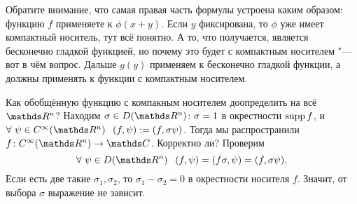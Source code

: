 Обратите внимание, что самая правая часть формулы устроена каким образом: функцию $f$ применяете к $\phi(x+y)$. Если $y$ фиксирована, то $\phi$ уже имеет компактный носитель, тут всё понятно. А то, что получается, является бесконечно гладкой функцией, но почему это будет с компактным носителем "--- вот в чём вопрос. Дальше $g(y)$ применяем к бесконечно гладкой функции, а должны применять к функции с компактным носителем.

Как обобщённую функцию с компакным носителем доопределить на всё $\R^n$? Находим $\sigma\in D(\R^n)\colon \sigma=1$ в окрестности $\operatorname{supp} f$, и $\forall\ \psi\in C^{\infty}(\R^n)\pau (f,\psi):=(f,\sigma \psi)$. Тогда мы распространили $f\colon C^{\infty}(\R^n)\to \C$. Корректно ли? Проверим
\[\forall\ \psi\in D(\R^n)\pau (f,\psi) = (f\sigma,\psi) = (f,\sigma\psi).\]
Если есть две такие $\sigma_1,\sigma_2$, то $\sigma_1-\sigma_2=0$ в окрестности носителя $f$. Значит, от выбора $\sigma$ выражение не зависит.

